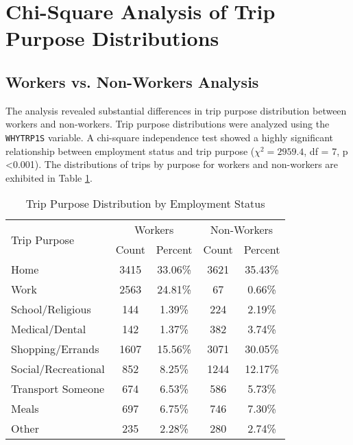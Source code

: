 
\section{Chi-Square Analysis of Trip Purpose Distributions}
\subsection{Workers vs. Non-Workers Analysis}

The analysis revealed substantial differences in trip purpose distribution between workers and non-workers. Trip purpose distributions were analyzed using the \texttt{WHYTRP1S} variable.  A chi-square independence test showed a highly significant relationship between employment status and trip purpose ($\chi^2 = 2959.4$, df = 7, p \textless 0.001). The distributions of trips by purpose for workers and non-workers are exhibited in Table \ref{tab:trip_purpose_employment}.


\begin{table}[h!]
  \centering
  \caption{Trip Purpose Distribution by Employment Status}
  \label{tab:trip_purpose_employment}
  \begin{tabular}{lcccc}
    \toprule
    \multirow{2}{*}{Trip Purpose} & \multicolumn{2}{c}{Workers} & \multicolumn{2}{c}{Non-Workers} \\
    \cmidrule(lr){2-3} \cmidrule(lr){4-5}
                                 & Count & Percent & Count & Percent \\
    \midrule
    Home                         & 3415  & 33.06\% & 3621  & 35.43\% \\
    Work                         & 2563  & 24.81\% & 67    & 0.66\%  \\
    School/Religious   & 144   & 1.39\%  & 224   & 2.19\%  \\
    Medical/Dental               & 142   & 1.37\%  & 382   & 3.74\%  \\
    Shopping/Errands             & 1607  & 15.56\% & 3071  & 30.05\% \\
    Social/Recreational          & 852   & 8.25\%  & 1244  & 12.17\% \\
    Transport Someone            & 674   & 6.53\%  & 586   & 5.73\%  \\
    Meals                        & 697   & 6.75\%  & 746   & 7.30\%  \\
    Other                        & 235   & 2.28\%  & 280   & 2.74\%  \\
    \bottomrule
  \end{tabular}

\end{table}

